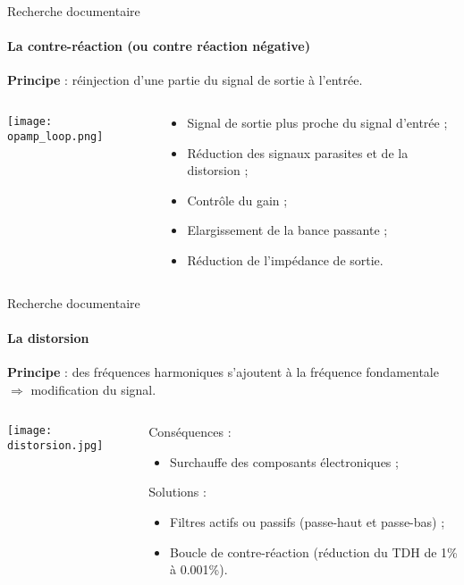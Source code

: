\documentclass[pdf]{beamer}
\begin{document}
\begin{frame}{Recherche documentaire}
	\framesubtitle{La contre-réaction (ou contre réaction négative)}
	
	\textbf{Principe} : réinjection d'une partie du signal de sortie à l'entrée.
	
	\begin{columns}
		\begin{column}{5cm}
			\texttt{[image: opamp\_loop.png]}
		\end{column}
		
		\begin{column}{5cm}
				\begin{itemize}
					\item Signal de sortie plus proche du signal d'entrée ;
					\item	Réduction des signaux parasites et de la distorsion ;
					\item Contrôle du gain ;
					\item Elargissement de la bance passante ;
					\item Réduction de l'impédance de sortie.
				\end{itemize}
		\end{column}
	\end{columns}
\end{frame}

\begin{frame}{Recherche documentaire}
	\framesubtitle{La distorsion}
	
	\textbf{Principe} : des fréquences harmoniques s'ajoutent à la fréquence fondamentale
	$\Rightarrow$ modification du signal.
	
	\bigbreak
	
	\begin{columns}
		\begin{column}{5cm}
			\texttt{[image: distorsion.jpg]}
		\end{column}
		
		\begin{column}{5cm}
			Conséquences :
			\begin{itemize}
				\item	Surchauffe des composants électroniques ;
			\end{itemize}
			
			Solutions :
			\begin{itemize}
				\item	Filtres actifs ou passifs (passe-haut et passe-bas) ;
				\item Boucle de contre-réaction (réduction du TDH de 1\% à 0.001\%).
			\end{itemize}
		\end{column}
	\end{columns}
\end{frame}
\end{document}
